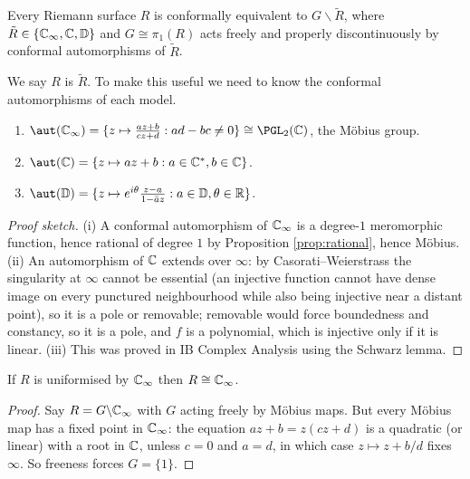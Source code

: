 \documentclass[a4paper]{scrartcl}
\newcommand{\Cinf}{\C_\infty}
\newcommand{\disc}{\mathbb{D}}
\newcommand{\Cs}{\C^*}
\begin{document}
\begin{corollary}\label{cor:uniformisationgeneral}
	Every Riemann surface $R$ is conformally equivalent to $G\backslash\tilde R$, where
	$\tilde R \in \{\Cinf, \C, \disc\}$ and $G \cong \pi_1(R)$ acts freely and properly
	discontinuously by conformal automorphisms of $\tilde R$.
\end{corollary}

We say $R$ is  $\tilde R$. To make this useful we need to know the
conformal automorphisms of each model.

\begin{proposition}\label{prop:automorphisms}
	\begin{enumerate}[label=(\roman*)]
		\item $\aut(\Cinf) = \{z\mapsto \frac{az+b}{cz+d} : ad-bc\neq0\} \cong \PGL_2(\C)$,
		the M\"obius group.
		\item $\aut(\C) = \{z\mapsto az+b : a \in \Cs, b\in\C\}$.
		\item $\aut(\disc) = \{z\mapsto e^{i\theta}\frac{z-a}{1-\bar az} : a\in\disc, \theta\in\R\}$.
	\end{enumerate}
\end{proposition}

\begin{proof}[Proof sketch]
	(i) A conformal automorphism of $\Cinf$ is a degree-$1$ meromorphic function, hence
	rational of degree $1$ by Proposition \ref{prop:rational}, hence M\"obius. (ii) An
	automorphism of $\mathbb{C}$ extends over $\infty$: by Casorati--Weierstrass the singularity at
	$\infty$ cannot be essential (an injective function cannot have dense image on every
	punctured neighbourhood while also being injective near a distant point), so it is a
	pole or removable; removable would force boundedness and constancy, so it is a pole, and
	$f$ is a polynomial, which is injective only if it is linear. (iii) This was proved in
	IB Complex Analysis using the Schwarz lemma.
\end{proof}

\begin{proposition}\label{prop:uniformbyCinf}
	If $R$ is uniformised by $\Cinf$ then $R \cong \Cinf$.
\end{proposition}

\begin{proof}
	Say $R = G\backslash\Cinf$ with $G$ acting freely by M\"obius maps. But every M\"obius
	map has a fixed point in $\Cinf$: the equation $az+b = z(cz+d)$ is a quadratic (or
	linear) with a root in $\mathbb{C}$, unless $c = 0$ and $a = d$, in which case $z \mapsto z + b/d$
	fixes $\infty$. So freeness forces $G = \{1\}$.
\end{proof}
\end{document}
